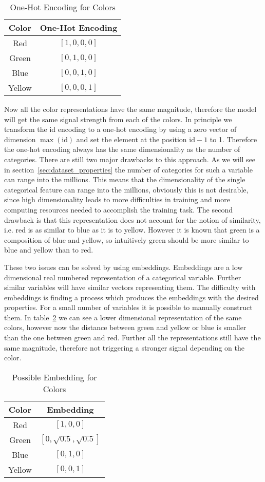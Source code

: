\begin{table}[ht]
    \centering
    \begin{tabular}{c|c}
    Color & One-Hot Encoding \\ \hline
    Red & $[1,0,0,0]$ \\
    Green & $[0,1,0,0]$ \\
    Blue & $[0,0,1,0]$ \\
    Yellow & $[0,0,0,1]$
    \end{tabular}
    \caption{One-Hot Encoding for Colors}
    \label{tab:one_hot_encoding}
\end{table}
Now all the color representations have the same magnitude, therefore the model will get the same signal strength from each of the colors.
In principle we transform the id encoding to a one-hot encoding by using a zero vector of dimension $\max(\text{id})$ and set the element at the position $\text{id}-1$ to 1.
Therefore the one-hot encoding always has the same dimensionality as the number of categories.
There are still two major drawbacks to this approach.
As we will see in section~\ref{sec:dataset_properties} the number of categories for such a variable can range into the millions.
This means that the dimensionality of the single categorical feature can range into the millions, obviously this is not desirable, since high dimensionality leads to more difficulties in training and more computing resources needed to accomplish the training task.
The second drawback is that this representation does not account for the notion of similarity, i.e. red is as similar to blue as it is to yellow.
However it is known that green is a composition of blue and yellow, so intuitively green should be more similar to blue and yellow than to red.
\par
These two issues can be solved by using embeddings.
Embeddings are a low dimensional real numbered representation of a categorical variable.
Further similar variables will have similar vectors representing them.
The difficulty with embeddings is finding a process which produces the embeddings with the desired properties.
For a small number of variables it is possible to manually construct them.
In table~\ref{tab:embedding} we can see a lower dimensional representation of the same colors, however now the distance between green and yellow or blue is smaller than the one between green and red.
Further all the representations still have the same magnitude, therefore not triggering a stronger signal depending on the color.
\begin{table}[ht]
    \centering
    \begin{tabular}{c|c}
    Color & Embedding \\ \hline
    Red & $[1,0,0]$ \\
    Green & $[0,\sqrt{0.5},\sqrt{0.5}]$ \\
    Blue & $[0,1,0]$ \\
    Yellow & $[0,0,1]$
    \end{tabular}
    \caption{Possible Embedding for Colors}
    \label{tab:embedding}
\end{table}

